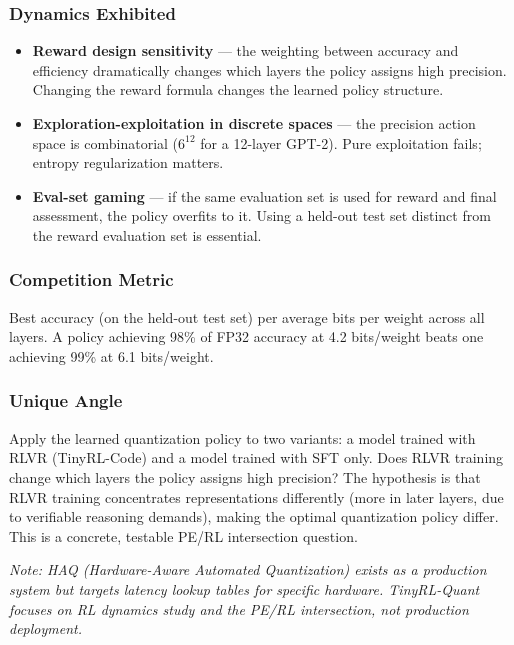 \subsubsection*{Dynamics Exhibited}

\begin{itemize}
  \item \textbf{Reward design sensitivity} --- the weighting between accuracy and efficiency dramatically changes which layers the policy assigns high precision. Changing the reward formula changes the learned policy structure.
  \item \textbf{Exploration-exploitation in discrete spaces} --- the precision action space is combinatorial ($6^{12}$ for a 12-layer GPT-2). Pure exploitation fails; entropy regularization matters.
  \item \textbf{Eval-set gaming} --- if the same evaluation set is used for reward and final assessment, the policy overfits to it. Using a held-out test set distinct from the reward evaluation set is essential.
\end{itemize}

\subsubsection*{Competition Metric}

Best accuracy (on the held-out test set) per average bits per weight across all layers. A policy achieving 98\% of FP32 accuracy at 4.2 bits/weight beats one achieving 99\% at 6.1 bits/weight.

\subsubsection*{Unique Angle}

Apply the learned quantization policy to two variants: a model trained with RLVR (TinyRL-Code) and a model trained with SFT only. Does RLVR training change which layers the policy assigns high precision? The hypothesis is that RLVR training concentrates representations differently (more in later layers, due to verifiable reasoning demands), making the optimal quantization policy differ. This is a concrete, testable PE/RL intersection question.

\textit{Note: HAQ (Hardware-Aware Automated Quantization) exists as a production system but targets latency lookup tables for specific hardware. TinyRL-Quant focuses on RL dynamics study and the PE/RL intersection, not production deployment.}

